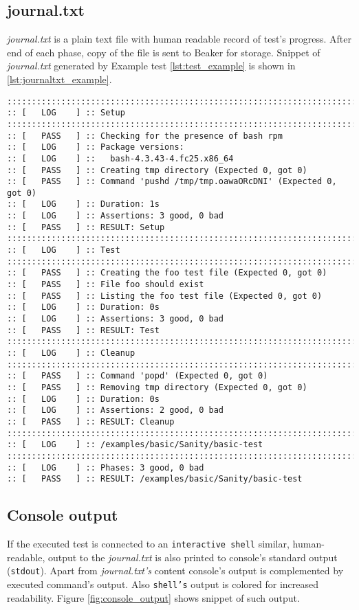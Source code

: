 \subsection{journal.txt}
\textit{journal.txt} is a plain text file with human readable record of test's progress. After end of each phase, copy of the file is sent to Beaker for storage. Snippet of \textit{journal.txt} generated by Example test \ref{lst:test_example} is shown in \ref{lst:journaltxt_example}.


\begin{lstlisting}[style=txt,caption={Example of journal.txt},label={lst:journaltxt_example}]
::::::::::::::::::::::::::::::::::::::::::::::::::::::::::::::::::::::::::::::::
:: [   LOG    ] :: Setup
::::::::::::::::::::::::::::::::::::::::::::::::::::::::::::::::::::::::::::::::
:: [   PASS   ] :: Checking for the presence of bash rpm
:: [   LOG    ] :: Package versions:
:: [   LOG    ] ::   bash-4.3.43-4.fc25.x86_64
:: [   PASS   ] :: Creating tmp directory (Expected 0, got 0)
:: [   PASS   ] :: Command 'pushd /tmp/tmp.oawaORcDNI' (Expected 0, got 0)
:: [   LOG    ] :: Duration: 1s
:: [   LOG    ] :: Assertions: 3 good, 0 bad
:: [   PASS   ] :: RESULT: Setup
::::::::::::::::::::::::::::::::::::::::::::::::::::::::::::::::::::::::::::::::
:: [   LOG    ] :: Test
::::::::::::::::::::::::::::::::::::::::::::::::::::::::::::::::::::::::::::::::
:: [   PASS   ] :: Creating the foo test file (Expected 0, got 0)
:: [   PASS   ] :: File foo should exist
:: [   PASS   ] :: Listing the foo test file (Expected 0, got 0)
:: [   LOG    ] :: Duration: 0s
:: [   LOG    ] :: Assertions: 3 good, 0 bad
:: [   PASS   ] :: RESULT: Test
::::::::::::::::::::::::::::::::::::::::::::::::::::::::::::::::::::::::::::::::
:: [   LOG    ] :: Cleanup
::::::::::::::::::::::::::::::::::::::::::::::::::::::::::::::::::::::::::::::::
:: [   PASS   ] :: Command 'popd' (Expected 0, got 0)
:: [   PASS   ] :: Removing tmp directory (Expected 0, got 0)
:: [   LOG    ] :: Duration: 0s
:: [   LOG    ] :: Assertions: 2 good, 0 bad
:: [   PASS   ] :: RESULT: Cleanup
::::::::::::::::::::::::::::::::::::::::::::::::::::::::::::::::::::::::::::::::
:: [   LOG    ] :: /examples/basic/Sanity/basic-test
::::::::::::::::::::::::::::::::::::::::::::::::::::::::::::::::::::::::::::::::
:: [   LOG    ] :: Phases: 3 good, 0 bad
:: [   PASS   ] :: RESULT: /examples/basic/Sanity/basic-test
\end{lstlisting}

\subsection{Console output}
\label{console_out}
If the executed test is connected to an \texttt{interactive shell} similar, human-readable, output to the \textit{journal.txt} is also printed to console's standard output (\texttt{stdout}). Apart from  \textit{journal.txt's} content console's output is complemented by executed command's output. Also \texttt{shell's} output is colored for increased readability.  Figure \ref{fig:console_output} shows snippet of such output.


